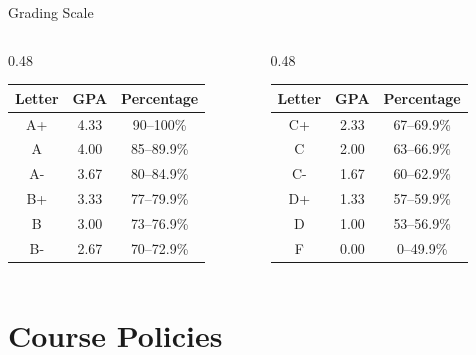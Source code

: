 \documentclass[aspectratio=169]{beamer}
\begin{document}
\begin{frame}{Grading Scale}
\transfade
\begin{columns}
  \begin{column}{0.48\textwidth}
    \begin{tabular}{@{}ccc@{}}
      \toprule
      \textbf{Letter} & \textbf{GPA} & \textbf{Percentage} \\
      \midrule
      A+  & 4.33 & 90--100\% \\
      A   & 4.00 & 85--89.9\% \\
      A-  & 3.67 & 80--84.9\% \\
      B+  & 3.33 & 77--79.9\% \\
      B   & 3.00 & 73--76.9\% \\
      B-  & 2.67 & 70--72.9\% \\
      \bottomrule
    \end{tabular}
  \end{column}
  \begin{column}{0.48\textwidth}
    \begin{tabular}{@{}ccc@{}}
      \toprule
      \textbf{Letter} & \textbf{GPA} & \textbf{Percentage} \\
      \midrule
      C+  & 2.33 & 67--69.9\% \\
      C   & 2.00 & 63--66.9\% \\
      C-  & 1.67 & 60--62.9\% \\
      D+  & 1.33 & 57--59.9\% \\
      D   & 1.00 & 53--56.9\% \\
      F   & 0.00 & 0--49.9\%  \\
      \bottomrule
    \end{tabular}
  \end{column}
\end{columns}
\end{frame}

\section{Course Policies}
\end{document}
